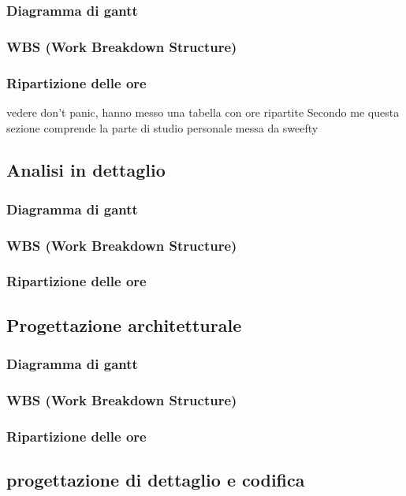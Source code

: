 			\subsubsection{Diagramma di gantt}
			\subsubsection{WBS (Work Breakdown Structure)}
			\subsubsection{Ripartizione delle ore}
				vedere don't panic, hanno messo una tabella con ore ripartite
				Secondo me questa sezione comprende la parte di studio personale messa da sweefty
				
		\subsection{Analisi in dettaglio}
			\subsubsection{Diagramma di gantt}
			\subsubsection{WBS (Work Breakdown Structure)}
			\subsubsection{Ripartizione delle ore}

		\subsection{Progettazione architetturale}
			\subsubsection{Diagramma di gantt}
			\subsubsection{WBS (Work Breakdown Structure)}
			\subsubsection{Ripartizione delle ore}
			
		\subsection{progettazione di dettaglio e codifica}
